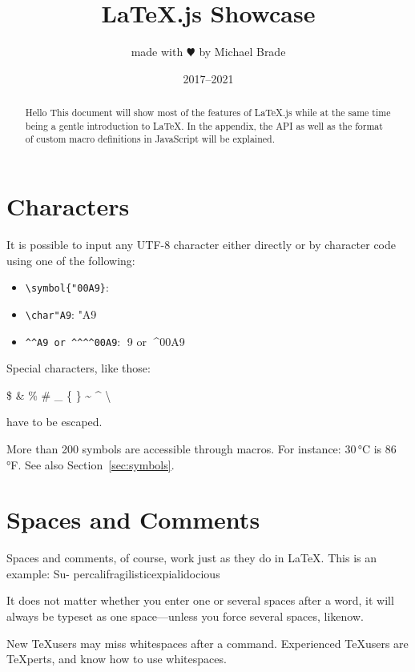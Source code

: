 \documentclass{article}
\title{\LaTeX.js Showcase}
\author{made with $\varheartsuit$ by Michael Brade}
\date{2017--2021}
\begin{document}
\maketitle

\begin{abstract}
Hello This document will show most of the features of \LaTeX.js while at the same time being a
gentle introduction to \LaTeX. In the appendix, the API as well as the format of custom macro definitions
in JavaScript will be explained.
\end{abstract}

\section{Characters}

It is possible to input any UTF-8 character either directly or by character code using one
of the following:

\begin{itemize}
  \item \texttt{\textbackslash symbol\{"00A9\}}: 
  \item \verb|\char"A9|: \char"A9
  \item \verb|^^A9 or ^^^^00A9|: ^^A9 or ^^^^00A9
\end{itemize}

\bigskip
\noindent
Special characters, like those:

\begin{center}
\$ \& \% \# \_ \{ \} \~{} \^{} \textbackslash
\end{center}

have to be escaped.

More than 200 symbols are accessible through macros. For instance: 30\,°C is 86\,°F.
See also Section~\ref{sec:symbols}.

\section{Spaces and Comments}

Spaces and comments, of course, work just as they do in \LaTeX. This is an example: Su-
percalifragilisticexpialidocious

It does not matter whether you enter one or several spaces after a word, it will always
be typeset as one space—unless you force several spaces, like\quad now.

New \TeX users may miss whitespaces after a command. Experienced \TeX users are
\TeX{}perts, and know how to use whitespaces.
\end{document}
